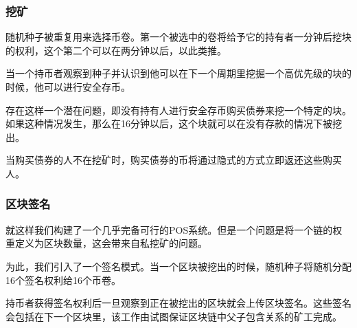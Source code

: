 \documentclass[letterpaper]{article}
\begin{document}
\subsubsection{挖矿}
随机种子被重复用来选择币卷。第一个被选中的卷将给予它的持有者一分钟后挖块的权利，这个第二个可以在两分钟以后，以此类推。

当一个持币者观察到种子并认识到他可以在下一个周期里挖掘一个高优先级的块的时候，他可以进行安全存币。

存在这样一个潜在问题，即没有持有人进行安全存币购买债券来挖一个特定的块。如果这种情况发生，那么在16分钟以后，这个块就可以在没有存款的情况下被挖出。

当购买债券的人不在挖矿时，购买债券的币将通过隐式的方式立即返还这些购买人。

\subsubsection{区块签名}
就这样我们构建了一个几乎完备可行的POS系统。但是一个问题是将一个链的权重定义为区块数量，这会带来自私挖矿的问题。

为此，我们引入了一个签名模式。当一个区块被挖出的时候，随机种子将随机分配16个签名权利给16个币卷。

持币者获得签名权利后一旦观察到正在被挖出的区块就会上传区块签名。这些签名会包括在下一个区块里，该工作由试图保证区块链中父子包含关系的矿工完成。
\end{document}
